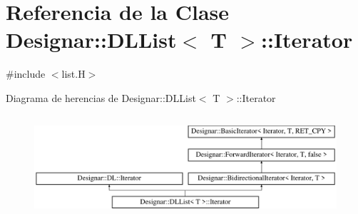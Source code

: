 \hypertarget{class_designar_1_1_d_l_list_1_1_iterator}{}\section{Referencia de la Clase Designar\+:\+:D\+L\+List$<$ T $>$\+:\+:Iterator}
\label{class_designar_1_1_d_l_list_1_1_iterator}


{\ttfamily \#include $<$list.\+H$>$}

Diagrama de herencias de Designar\+:\+:D\+L\+List$<$ T $>$\+:\+:Iterator\begin{figure}[H]
\begin{center}
\leavevmode
\includegraphics[height=3.822526cm]{class_designar_1_1_d_l_list_1_1_iterator}
\end{center}
\end{figure}
